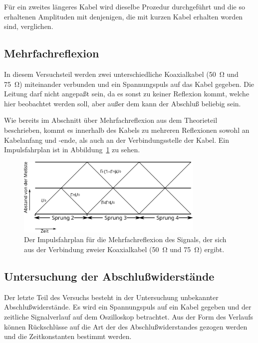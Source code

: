 Für ein zweites längeres Kabel wird dieselbe Prozedur durchgeführt und
die so erhaltenen Amplituden mit denjenigen, die mit kurzen Kabel
erhalten worden sind, verglichen.

\subsection{Mehrfachreflexion}
\label{sec:durchfuehrung-mehrfachreflexion}

In diesem Versuchsteil werden zwei unterschiedliche Koaxialkabel
(\SI{50}{\ohm} und \SI{75}{\ohm}) miteinander verbunden und ein
Spannungspuls auf das Kabel gegeben.  Die Leitung darf nicht angepaßt
sein, da es sonst zu keiner Reflexion kommt, welche hier beobachtet
werden soll, aber außer dem kann der Abschluß beliebig sein.

Wie bereits im Abschnitt über Mehrfachreflexion aus dem Theorieteil
beschrieben, kommt es innerhalb des Kabels zu mehreren Reflexionen
sowohl an Kabelanfang und -ende, als auch an der Verbindungsstelle der
Kabel.  Ein Impulsfahrplan ist in Abbildung~\ref{fig:impulsfahrplan} zu
sehen.

\begin{figure}
  \centering
  \includegraphics[width=0.8\textwidth]{impulsfahrplan}
  \caption{Der Impulsfahrplan für die Mehrfachreflexion des Signals, der
    sich aus der Verbindung zweier Koaxialkabel (\SI{50}{\ohm} und
    \SI{75}{\ohm}) ergibt.}
  \label{fig:impulsfahrplan}
\end{figure}

\subsection{Untersuchung der Abschlußwiderstände}

Der letzte Teil des Versuchs besteht in der Untersuchung unbekannter
Abschlußwiderstände.  Es wird ein Spannungspuls auf ein Kabel gegeben
und der zeitliche Signalverlauf auf dem Oszilloskop betrachtet.  Aus der
Form des Verlaufs können Rückschlüsse auf die Art der des
Abschlußwiderstandes gezogen werden und die Zeitkonstanten bestimmt
werden.
